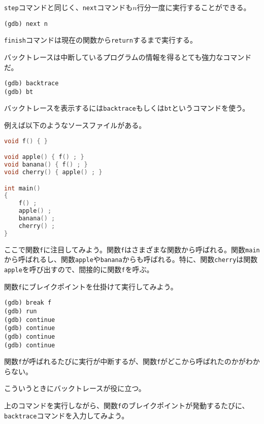 \texttt{step}コマンドと同じく、\texttt{next}コマンドも\(n\)行分一度に実行することができる。

\begin{lstlisting}[style=terminal]
(gdb) next n
\end{lstlisting}


\texttt{finish}コマンドは現在の関数から\texttt{return}するまで実行する。

\clearpage
{}

バックトレースは中断しているプログラムの情報を得るとても強力なコマンドだ。

\begin{lstlisting}[style=terminal]
(gdb) backtrace
(gdb) bt
\end{lstlisting}

バックトレースを表示するには\texttt{backtrace}もしくは\texttt{bt}というコマンドを使う。

例えば以下のようなソースファイルがある。

\begin{lstlisting}[language={C++}]
void f() { }

void apple() { f() ; } 
void banana() { f() ; } 
void cherry() { apple() ; } 

int main()
{
    f() ;
    apple() ;
    banana() ;
    cherry() ;
}
\end{lstlisting}

ここで関数\texttt{f}に注目してみよう。関数\texttt{f}はさまざまな関数から呼ばれる。関数\texttt{main}から呼ばれるし、関数\texttt{apple}や\texttt{banana}からも呼ばれる。特に、関数\texttt{cherry}は関数\texttt{apple}を呼び出すので、間接的に関数\texttt{f}を呼ぶ。

関数\texttt{f}にブレイクポイントを仕掛けて実行してみよう。

\begin{lstlisting}[style=terminal]
(gdb) break f
(gdb) run
(gdb) continue
(gdb) continue
(gdb) continue
(gdb) continue
\end{lstlisting}

関数\texttt{f}が呼ばれるたびに実行が中断するが、関数\texttt{f}がどこから呼ばれたのかがわからない。

こういうときにバックトレースが役に立つ。

上のコマンドを実行しながら、関数\texttt{f}のブレイクポイントが発動するたびに、\texttt{backtrace}コマンドを入力してみよう。

